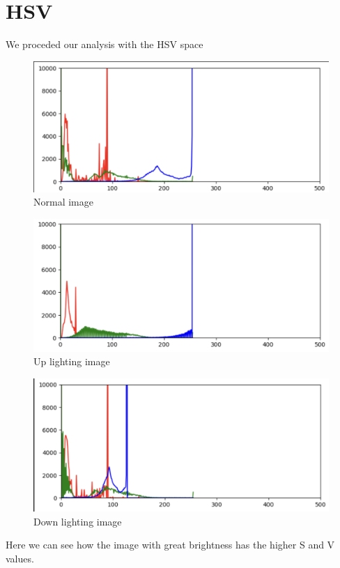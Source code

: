 \documentclass{report}
\begin{document}
\section{HSV}
We proceded our analysis with the HSV space
\begin{figure}[H]
\includegraphics[scale=0.4]{Images/HSVNormal.png}
 \caption{Normal image}
\centering
\end{figure}
\begin{figure}[H]
\includegraphics[scale=0.4]{Images/HSVUp.png}
 \caption{Up lighting image}
\centering
\end{figure}
\begin{figure}[H]
\includegraphics[scale=0.4]{Images/HSVDown.png}
 \caption{Down lighting image}
\centering
\end{figure}
Here we can see how the image with great brightness has the higher S and V values. 
\end{document}
